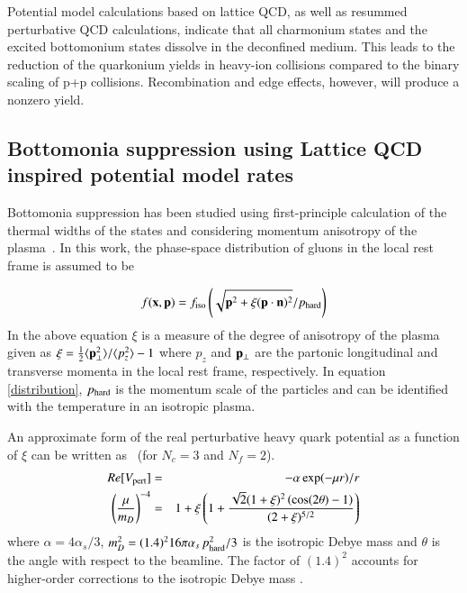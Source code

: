 Potential model calculations based on lattice QCD, as well as resummed 
perturbative QCD calculations, indicate that all charmonium states and the
excited bottomonium states dissolve in the deconfined medium. This leads to 
the reduction of the quarkonium yields in heavy-ion collisions 
compared to the binary scaling of p+p collisions. Recombination and edge
effects, however, will produce a nonzero yield.


              
\subsection{Bottomonia suppression using Lattice QCD inspired potential model rates}

Bottomonia suppression has been studied using first-principle
calculation of the thermal widths of the states and considering 
momentum anisotropy of the plasma~\cite{Strickland:2011aa,Krouppa:2016jcl,Krouppa:2018lkt}.
In this work, the phase-space distribution of gluons in the local
rest frame is assumed to be 

\begin{equation} 
f({\bf x},{\bf p}) = f_{\rm iso}\left(\sqrt{{\bf p}^2+ \xi({\bf p}\cdot{\bf n})^2 }  / 
p_{\rm hard} \right) 
\label{distribution}
\end{equation} 
In the above equation $\xi$ is a measure of the degree of anisotropy of the plasma given as 
$\xi = \frac{1}{2} \langle 
{\bf p}_\perp^2\rangle/\langle p_z^2\rangle -1$
where $p_z$ and 
${\bf p}_\perp $ are the partonic longitudinal and transverse momenta in the local
rest frame, respectively. In equation \ref{distribution}, $p_{\rm hard}$ is the momentum  
scale of the particles and can be identified with the temperature
in an isotropic plasma. 

An approximate form of the real perturbative heavy quark potential as a function of
$\xi$ can be written as~\cite{Dumitru:2007hy} (for $N_c=3$ and $N_f=2$). 
\begin{eqnarray}
Re[V_{\rm pert}] &=& - \alpha \exp(-\mu r)/r \nonumber \\
\left(\frac{\mu}{m_D}\right)^{-4} &=&  
1 + \xi\left(1 + \frac{\sqrt{2}(1+\xi)^2\left(\cos(2\theta) - 1 \right)}{(2+ \xi)^{5/2}} \right) 
\label{eq:muparam}
\end{eqnarray}
where $\alpha = 4\alpha_s/3$, $m_D^2 = (1.4)^2 16 \pi \alpha_s  \, p_{\rm hard}^2/3$ is the isotropic
Debye mass and $\theta$ is the angle with respect to the beamline.  
The factor of $(1.4)^2$ accounts for higher-order corrections to the isotropic Debye 
mass \cite{Kaczmarek:2004gv}.

